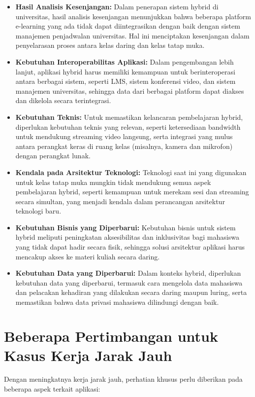 \begin{itemize}
	\item \textbf{Hasil Analisis Kesenjangan:} Dalam penerapan sistem hybrid di universitas, hasil analisis kesenjangan menunjukkan bahwa beberapa platform e-learning yang ada tidak dapat diintegrasikan dengan baik dengan sistem manajemen penjadwalan universitas. Hal ini menciptakan kesenjangan dalam penyelarasan proses antara kelas daring dan kelas tatap muka.
	
	\item \textbf{Kebutuhan Interoperabilitas Aplikasi:} Dalam pengembangan lebih lanjut, aplikasi hybrid harus memiliki kemampuan untuk berinteroperasi antara berbagai sistem, seperti LMS, sistem konferensi video, dan sistem manajemen universitas, sehingga data dari berbagai platform dapat diakses dan dikelola secara terintegrasi.
	
	\item \textbf{Kebutuhan Teknis:} Untuk memastikan kelancaran pembelajaran hybrid, diperlukan kebutuhan teknis yang relevan, seperti ketersediaan bandwidth untuk mendukung streaming video langsung, serta integrasi yang mulus antara perangkat keras di ruang kelas (misalnya, kamera dan mikrofon) dengan perangkat lunak.
	
	\item \textbf{Kendala pada Arsitektur Teknologi:} Teknologi saat ini yang digunakan untuk kelas tatap muka mungkin tidak mendukung semua aspek pembelajaran hybrid, seperti kemampuan untuk merekam sesi dan streaming secara simultan, yang menjadi kendala dalam perancangan arsitektur teknologi baru.
	
	\item \textbf{Kebutuhan Bisnis yang Diperbarui:} Kebutuhan bisnis untuk sistem hybrid meliputi peningkatan aksesibilitas dan inklusivitas bagi mahasiswa yang tidak dapat hadir secara fisik, sehingga solusi arsitektur aplikasi harus mencakup akses ke materi kuliah secara daring.
	
	\item \textbf{Kebutuhan Data yang Diperbarui:} Dalam konteks hybrid, diperlukan kebutuhan data yang diperbarui, termasuk cara mengelola data mahasiswa dan pelacakan kehadiran yang dilakukan secara daring maupun luring, serta memastikan bahwa data privasi mahasiswa dilindungi dengan baik.
\end{itemize}


\section{Beberapa Pertimbangan untuk Kasus Kerja Jarak Jauh}
Dengan meningkatnya kerja jarak jauh, perhatian khusus perlu diberikan pada beberapa aspek terkait aplikasi:

